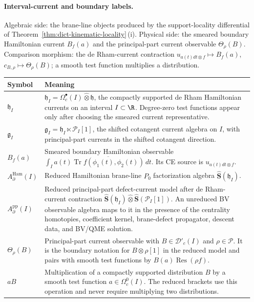 \paragraph{Interval-current and boundary labels.}
Algebraic side: the brane-line objects produced by the support-locality
differential of Theorem~\ref{thm:dict-kinematic-locality}\,(i).
Physical side: the smeared boundary Hamiltonian current \(B_f(a)\) and the
principal-part current observable \(\Theta_\rho(B)\).  Comparison
morphism: the de Rham-current contraction
\(u_{a(t)dt\otimes f}\mapsto B_f(a)\),
\(c_{B,\rho}\mapsto\Theta_\rho(B)\); a smooth test function multiplies
a distribution.
\begin{center}
\begin{tabular}{@{}>{\raggedright\arraybackslash}p{}
  >{\raggedright\arraybackslash}p{}@{}}
\hline
\textbf{Symbol} & \textbf{Meaning}\\
\hline
\(\mathfrak h_I\) &
\(\mathfrak h_I=\Omega^\bullet_c(I)\widehat\otimes\mathfrak h\), the
compactly supported de Rham Hamiltonian currents on an interval
\(I\subset\R\). Degree-zero test functions appear only after choosing the
smeared current representative.\\
\hline
\(\mathfrak g_I\) &
\(\mathfrak g_I=\mathfrak h_I\ltimes\mathcal P_I[1]\), the shifted
cotangent current algebra on \(I\), with principal-part currents in the
shifted cotangent direction.\\
\hline
\(B_f(a)\) &
Smeared boundary Hamiltonian observable
\(\int_I a(t)\overline{\operatorname{Tr}f(\phi_1(t),\phi_2(t))}\,dt\).
Its CE source is \(u_{a(t)dt\otimes f}\).\\
\hline
\(A^{\mathrm{Ham}}_\partial(I)\) &
Reduced Hamiltonian brane-line \(P_0\) factorization algebra
\(\widehat{\mathbf S}(\mathfrak h_I)\).\\
\hline
\(A^{\mathrm{pp}}_\partial(I)\) &
Reduced principal-part defect-current model after de Rham-current contraction
\(\widehat{\mathbf S}(\mathfrak h_I)\widehat\otimes
\widehat{\mathbf S}(\mathcal P_I[1])\).  An unreduced BV observable
algebra maps to it in the presence of the centrality homotopies,
coefficient kernel, brane-defect propagator, descent data, and BV/QME
solution.\\
\hline
\(\Theta_\rho(B)\) &
Principal-part current observable with
\(B\in\mathcal D'_c(I)\) and \(\rho\in\mathcal P\). It is the boundary
notation for \(B\otimes\rho[1]\) in the reduced model and pairs with
smooth test functions by \(B(a)\operatorname{Res}(\rho f)\).\\
\hline
\(aB\) &
Multiplication of a compactly supported distribution \(B\) by a smooth
test function \(a\in\Omega^0_c(I)\). The reduced brackets use this
operation and never require multiplying two distributions.\\
\hline
\end{tabular}
\end{center}
\endgroup
